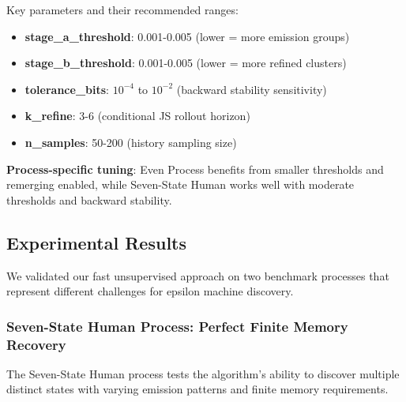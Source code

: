 \documentclass[11pt]{article}
\begin{document}
\begin{notebox}
Key parameters and their recommended ranges:

\begin{itemize}
\item \textbf{stage\_a\_threshold}: 0.001-0.005 (lower = more emission groups)
\item \textbf{stage\_b\_threshold}: 0.001-0.005 (lower = more refined clusters)
\item \textbf{tolerance\_bits}: $10^{-4}$ to $10^{-2}$ (backward stability sensitivity)
\item \textbf{k\_refine}: 3-6 (conditional JS rollout horizon)
\item \textbf{n\_samples}: 50-200 (history sampling size)
\end{itemize}

\textbf{Process-specific tuning}: Even Process benefits from smaller thresholds and remerging enabled, while Seven-State Human works well with moderate thresholds and backward stability.
\end{notebox}

\subsection{Experimental Results}

We validated our fast unsupervised approach on two benchmark processes that represent different challenges for epsilon machine discovery.

\subsubsection{Seven-State Human Process: Perfect Finite Memory Recovery}

The Seven-State Human process tests the algorithm's ability to discover multiple distinct states with varying emission patterns and finite memory requirements.
\end{document}
